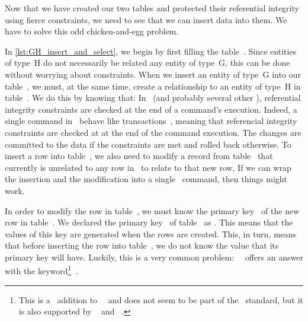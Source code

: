 Now that we have created our two tables and protected their referential integrity using fierce constraints, we need to see that we can insert data into them.
We have to solve this odd chicken-and-egg problem.

In \cref{lst:GH_insert_and_select}, we begin by first filling the table~.
Since entities of type~H do not necessarily be related any entity of type~G, this can be done without worrying about constraints.
When we insert an entity of type~G into our table~, we must, at the same time, create a relationship to an entity of type~H in table~.
We do this by knowing that:%
%
%
%
In \postgresql~(and probably several other ), referential integrity constraints are checked at the end of a command's execution.
Indeed, a single command in \postgresql\ behave like transactions~\cite{PGDG:T}, meaning that referencial integrity constraints are checked at at the end of the command execution.
The changes are committed to the data if the constraints are met and rolled back otherwise.
To insert a row into table~, we also need to modify a record from table~ that currently is unrelated to any row in~ to relate to that new row,
If we can wrap the insertion and the modification into a single \sql\ command, then things might work.

In order to modify the row in table~, we must know the primary key~ of the new row in table~.
We declared the primary key~ of table~ as .
This means that the values of this key are generated when the rows are created.
This, in turn, means that before inserting the row into table~, we do not know the value that its primary key will have.
Luckily, this is a very common problem:~
\postgresql\ offers an answer with the  keyword\footnote{%
This is a \postgresql\ addition to~\sql~\cite{SE:DA:2020WDSSOAOTNPSDIOR} and does not seem to be part of the \sql\ standard, but it is also supported by \mariadb~\cite{M:MSD:IR} and \sqlite~\cite{HWACIS:R}.%
}~\cite{PGDG:PD:RDFMR}.%

